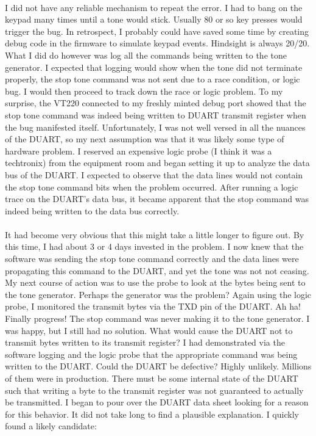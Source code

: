 \paragraph {}
I did not have any reliable mechanism to repeat the error. I had to bang on the
keypad many times until a tone would stick. Usually 80 or so key presses would
trigger the bug. In retrospect, I probably could have saved some time by
creating debug code in the firmware to simulate keypad events. Hindsight is
always 20/20. What I did do however was log all the commands being written to
the tone generator. I expected that logging would show when the tone did not
terminate properly, the stop tone command was not sent due to a race condition,
or logic bug. I would then proceed to track down the race or logic problem. To
my surprise, the VT220 connected to my freshly minted debug port showed that the
stop tone command was indeed being written to DUART transmit register when the
bug manifested itself. Unfortunately, I was not well versed in all the nuances
of the DUART, so my next assumption was that it was likely some type of hardware
problem. I reserved an expensive logic probe (I think it was a techtronix) from
the equipment room and began setting it up to analyze the data bus of the DUART.
I expected to observe that the data lines would not contain the stop tone
command bits when the problem occurred. After running a logic trace on the
DUART's data bus, it became apparent that the stop command was indeed being
written to the data bus correctly.
\paragraph {}
It had become very obvious that this might take a little longer to figure out.
By this time, I had about 3 or 4 days invested in the problem. I now knew that
the software was sending the stop tone command correctly and the data lines were
propagating this command to the DUART, and yet the tone was not not ceasing. My
next course of action was to use the probe to look at the bytes being sent to
the tone generator. Perhaps the generator was the problem? Again using the logic
probe, I monitored the transmit bytes via the TXD pin of the DUART. Ah ha!
Finally progress! The stop command was never making it to the tone generator. I
was happy, but I still had no solution. What would cause the DUART not to
transmit bytes written to its transmit register? I had demonstrated via the
software logging and the logic probe that the appropriate command was being
written to the DUART. Could the DUART be defective? Highly unlikely. Millions of
them were in production. There must be some internal state of the DUART such
that writing a byte to the transmit register was not guaranteed to actually be
transmitted. I began to pour over the DUART data sheet looking for a reason for
this behavior. It did not take long to find a plausible explanation. I quickly
found a likely candidate:


